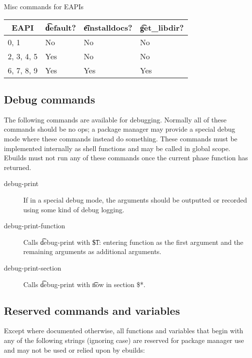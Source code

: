 \begin{centertable}{Misc commands for EAPIs}
    \label{tab:misc-commands}
    \begin{tabular}{llll}
      \toprule
      \multicolumn{1}{c}{\textbf{EAPI}} &
      \multicolumn{1}{c}{\textbf{\t{default}?}} &
      \multicolumn{1}{c}{\textbf{\t{einstalldocs}?}} &
      \multicolumn{1}{c}{\textbf{\t{get_libdir}?}} \\
      \midrule
      0, 1              & No  & No  & No  \\
      2, 3, 4, 5        & Yes & No  & No  \\
      6, 7, 8, 9        & Yes & Yes & Yes \\
      \bottomrule
    \end{tabular}
\end{centertable}

\subsection{Debug commands}
The following commands are available for debugging. Normally all of these commands should be no ops;
a package manager may provide a special debug mode where these commands instead do something.
These commands must be implemented internally as shell functions and may be called in global scope.
Ebuilds must not run any of these commands once the current phase function has returned.

\begin{description}
\item[debug-print] If in a special debug mode, the arguments should be outputted or recorded using
    some kind of debug logging.
\item[debug-print-function] Calls \t{debug-print} with \t{\$1: entering function} as the first
    argument and the remaining arguments as additional arguments.
\item[debug-print-section] Calls \t{debug-print} with \t{now in section \$*}.
\end{description}

\subsection{Reserved commands and variables}

Except where documented otherwise, all functions and variables that begin with any of the following
strings (ignoring case) are reserved for package manager use and may not be used or relied upon by
ebuilds:

